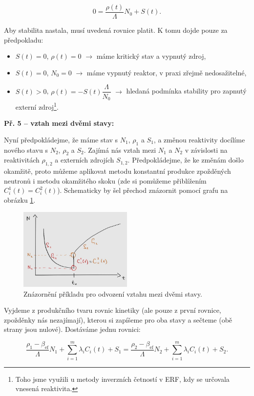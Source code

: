 $$ 0 = \dfrac{\rho(t)}{\Lambda} N_0 + S(t). $$

Aby stabilita nastala, musí uvedená rovnice platit. K tomu dojde pouze za předpokladu:

\begin{itemize}
  \item $S(t) = 0$, $\rho(t) = 0$ $\rightarrow$ máme kritický stav a vypnutý zdroj,
  \item $S(t) = 0$, $N_0 = 0$ $\rightarrow$ máme vypnutý reaktor, v praxi zřejmě nedosažitelné,
  \item $S(t) > 0$, $\rho(t) = -S(t) \dfrac{\Lambda}{N_0}$ $\rightarrow$ hledaná podmínka stability pro zapnutý externí zdroj\footnote{Toho jsme využili u metody inverzních četností v ERF, kdy se určovala vnesená reaktivita.}.
\end{itemize}

\textbf{Př. 5 -- vztah mezi dvěmi stavy:}

Nyní předpokládejme, že máme stav s $N_1$, $\rho_1$ a $S_1$, a změnou reaktivity docílíme nového stavu s $N_2$, $\rho_2$ a $S_2$. Zajímá nás vztah mezi $N_1$ a $N_2$ v závislosti na reaktivitách $\rho_{1,2}$ a externích zdrojích $S_{1,2}$. Předpokládejme, že ke změnám došlo okamžitě, proto můžeme aplikovat metodu konstantní produkce zpožděných neutronů i metodu okamžitého skoku (zde si pomůžeme přiblížením $C_i^1(t) = C_i^2(t)$). Schematicky by šel přechod znázornit pomocí grafu na obrázku \ref{fig_podil_N_ukazka}.

\begin{figure}[H]
  \centering
  \includegraphics[width=0.5\textwidth]{img/podil_N_ukazka.jpg}
  \caption{Znázornění příkladu pro odvození vztahu mezi dvěmi stavy.}
  \label{fig_podil_N_ukazka}
\end{figure}

Vyjdeme z produkčního tvaru rovnic kinetiky (ale pouze z první rovnice, zpožděnky nás nezajímají), kterou si zapíšeme pro oba stavy a sečteme (obě strany jsou nulové). Dostáváme jednu rovnici:

$$ \dfrac{\rho_1 - \beta_{\text{ef}}}{\Lambda} N_1 + \sum_{i=1}^m \lambda_i C_i(t) + S_1 = \dfrac{\rho_2 - \beta_{\text{ef}}}{\Lambda} N_2 + \sum_{i=1}^m \lambda_i C_i(t) + S_2. $$

